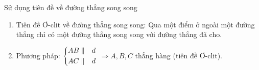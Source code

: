 \begin{dang}{Sử dụng tiên đề về đường thẳng song song}
	\begin{enumerate}[-]
		\item Tiên đề Ơ-clit về đường thẳng song song: Qua một điểm ở ngoài một đường thẳng chỉ có một đường thẳng song song với đường thẳng đã cho.
		\item Phương pháp:
		{ $\left\{\begin{aligned}& AB \parallel &d \\ & AC  \parallel &d \end{aligned}\right.$ $\Rightarrow A, B, C$ thẳng hàng (tiên đề Ơ-clit).}
	\end{enumerate}
\end{dang}

